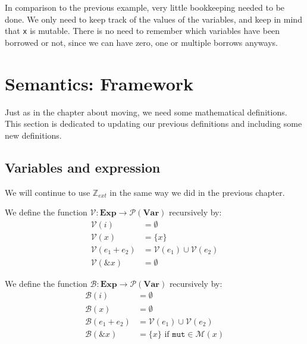 In comparison to the previous example, very little bookkeeping needed to be done. We only need to keep track of the values of the variables, and keep in mind that \texttt{x} is mutable. There is no need to remember which variables have been borrowed or not, since we can have zero, one or multiple borrows anyways. 

\section{Semantics: Framework}
Just as in the chapter about moving, we need some mathematical definitions. This section is dedicated to updating our previous definitions and including some new definitions. 

\subsection*{Variables and expression}
We will continue to use $\mathbb{Z}_{ext}$ in the same way we did in the previous chapter. 

\begin{definition}
We define the function $\mathcal{V}: \textbf{Exp} \to \mathcal{P}(\textbf{Var})$ recursively by:
\begin{align*}
    \mathcal{V}(i)          &= \emptyset
\\  \mathcal{V}(x)          &= \{ x \}
\\  \mathcal{V}(e_1 + e_2)  &= \mathcal{V}(e_1) \cup \mathcal{V}(e_2)
\\  \mathcal{V}(\& x)       &= \emptyset
\end{align*}
\end{definition}

\begin{definition}
We define the function $\mathcal{B}: \textbf{Exp} \to \mathcal{P}(\textbf{Var})$ recursively by:
\begin{align*}
    \mathcal{B}(i)          &= \emptyset
\\  \mathcal{B}(x)          &= \emptyset
\\  \mathcal{B}(e_1 + e_2)  &= \mathcal{V}(e_1) \cup \mathcal{V}(e_2)
\\  \mathcal{B}(\& x)       &= \{ x \} \textrm{ if } \texttt{mut} \in \mathcal{M}(x) 
\end{align*}
\end{definition}

